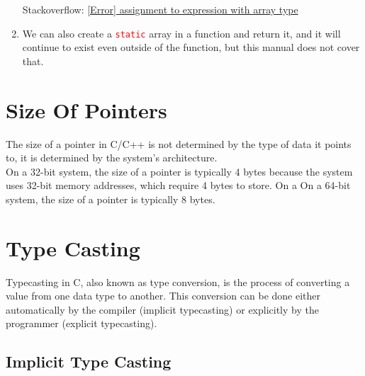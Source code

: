 \documentclass[12pt]{article}
\begin{document}
\begin{enumerate}
\begin{verbatim}
\end{verbatim}

    \vspace{1cm}

    Stackoverflow: \href{https://stackoverflow.com/questions/37225244/error-assignment-to-expression-with-array-type-error-when-i-assign-a-struct-f}{[Error] assignment to expression with array type}





    \item We can also create a \textcolor{red}{\texttt{static}} array in a function and return it, and it will continue to exist even outside of the function, but this manual does not cover 
    that.

\end{enumerate}


\newpage
{}
\section*{Size Of Pointers}

\noindent The size of a pointer in C/C++ is not determined by the type of data it points to, it is determined by the system's architecture. \\

\noindent On a 32-bit system, the size of a pointer is typically 4 bytes because the system uses 32-bit memory addresses, which require 4 bytes to store. On a On a 64-bit system, the size of 
a pointer is typically 8 bytes. \\

\newpage
{}
\section*{Type Casting}

\noindent Typecasting in C, also known as type conversion, is the process of converting a value from one data type to another. This conversion can be done either automatically by the compiler 
(implicit typecasting) or explicitly by the programmer (explicit typecasting).

\subsection*{Implicit Type Casting}
\end{document}
